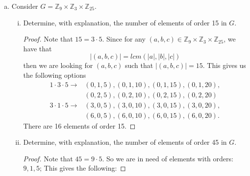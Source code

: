 \documentclass[12pt]{article}
\begin{document}
\begin{enumerate}
\begin{enumerate}[(a)]
\begin{proof}
                    \end{proof}
                \item Consider
                    $G=\mathbb{Z}_9\times\mathbb{Z}_3\times\mathbb{Z}_{25}$.
                    \begin{enumerate}[i.]
                        \item Determine, with explanation, the number of
                            elements of order 15 in $G$.
                            \begin{proof}
                                Note that $15=3\cdot 5$. Since for any $(a, b,
                                c)\in\mathbb{Z}_{9}\times\mathbb{Z}_{3}\times\mathbb{Z}_{25}$,
                                we have that 
                                \begin{equation*}
                                    |(a, b, c)|=lcm(|a|, |b|, |c|)
                                \end{equation*}
                                then we are looking for $(a, b, c)$ such that
                                $|(a, b, c)|=15$. This gives us the following
                                options
                                \begin{align*}
                                    1\cdot3\cdot 5\to&(0, 1, 5),(0,
                                    1, 10), (0, 1, 15), (0, 1, 20), \\
                                    &(0, 2, 5), (0, 2, 10), (0, 2, 15), (0, 2,
                                    20) \\
                                    3\cdot 1\cdot 5\to&(3, 0, 5), (3, 0, 10),
                                    (3, 0, 15), (3, 0, 20), \\
                                    &(6, 0, 5), (6, 0, 10), (6, 0, 15), (6, 0,
                                    20).
                                \end{align*}
                                There are 16 elements of order 15. 
                            \end{proof}
                        \item Determine, with explanation, the number of
                            elements of order 45 in $G$. 
                            \begin{proof}
                                Note that $45=9\cdot 5$. So we are in
                                need of elements with orders: $9, 1, 5$; 
                                This gives the following:

\end{proof}
\end{enumerate}
\end{enumerate}
\end{enumerate}
\end{document}
